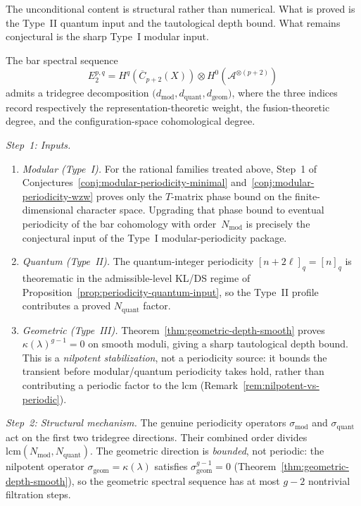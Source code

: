 \begin{evidence}
The unconditional content is structural rather than numerical.
What is proved is the Type~II quantum input and the tautological
depth bound.  What remains conjectural is the sharp Type~I modular
input.

The bar spectral sequence
\[
E_2^{p,q} = H^q(\overline{C}_{p+2}(X))
  \otimes H^0(\mathcal{A}^{\otimes(p+2)})
\]
admits a tridegree decomposition
$\bigl(d_{\mathrm{mod}}, d_{\mathrm{quant}}, d_{\mathrm{geom}}\bigr)$,
where the three indices record respectively the representation-theoretic
weight, the fusion-theoretic degree, and the configuration-space
cohomological degree.

\emph{Step~1: Inputs.}
\begin{enumerate}
\item \emph{Modular (Type~I).}  For the rational families treated
  above, Step~1 of
  Conjectures~\ref{conj:modular-periodicity-minimal}
  and~\ref{conj:modular-periodicity-wzw} proves only the
  $T$-matrix phase bound on the finite-dimensional character space.
  Upgrading that phase bound to eventual periodicity of the bar
  cohomology with order~$N_{\mathrm{mod}}$ is precisely the
  conjectural input of the Type~I modular-periodicity package.
\item \emph{Quantum (Type~II).}  The quantum-integer periodicity
  $[n + 2\ell]_q = [n]_q$ is theorematic in the admissible-level
  KL/DS regime of Proposition~\ref{prop:periodicity-quantum-input}, so
  the Type~II profile contributes a proved
  $N_{\mathrm{quant}}$ factor.
\item \emph{Geometric (Type~III).}
  Theorem~\ref{thm:geometric-depth-smooth} proves
  $\kappa(\lambda)^{g-1} = 0$ on smooth moduli, giving a
  sharp tautological depth bound.  This is a \emph{nilpotent
  stabilization}, not a periodicity source: it bounds the
  transient before modular/quantum periodicity takes hold,
  rather than contributing a periodic factor to the lcm
  (Remark~\ref{rem:nilpotent-vs-periodic}).
\end{enumerate}

\emph{Step~2: Structural mechanism.}
The genuine periodicity operators
$\sigma_{\mathrm{mod}}$ and $\sigma_{\mathrm{quant}}$
act on the first two tridegree directions.  Their combined order
divides
$\mathrm{lcm}(N_{\mathrm{mod}}, N_{\mathrm{quant}})$.
The geometric direction is \emph{bounded}, not periodic: the
nilpotent operator $\sigma_{\mathrm{geom}} = \kappa(\lambda)$
satisfies $\sigma_{\mathrm{geom}}^{g-1} = 0$
(Theorem~\ref{thm:geometric-depth-smooth}), so the
geometric spectral sequence has at most $g - 2$ nontrivial
filtration steps.


\end{evidence}
